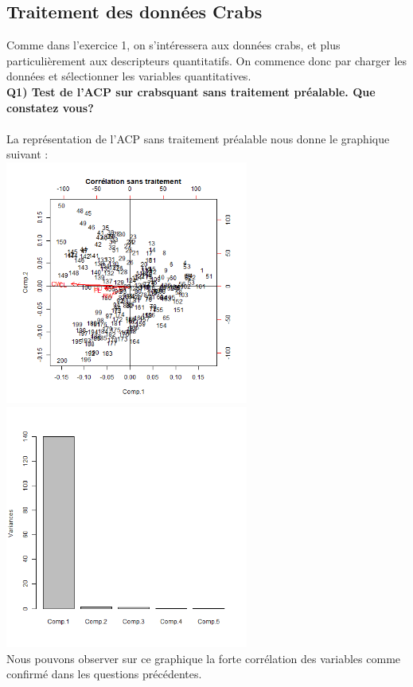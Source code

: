 ﻿\documentclass[a4paper, 9pt]{article}
\begin{document}
\subsection{Traitement des donn\'ees Crabs}
Comme dans l’exercice 1, on s’intéressera aux données crabs, et plus particulièrement aux descripteurs quantitatifs. On commence donc par charger les données et sélectionner les variables
quantitatives.\\


\textbf{Q1) Test de l’ACP sur crabsquant sans traitement préalable. Que constatez vous?}\\ \\
La repr\'esentation de l'ACP sans traitement pr\'ealable nous donne le graphique suivant :\\


\includegraphics[height = 8cm, width = 8cm]{plots/biplot_acp2_crabs.png}
\includegraphics[height = 8cm, width = 8cm]{plots/plot_acp2_crabs.png}\\
Nous pouvons observer sur ce graphique la forte corr\'elation des variables comme confirmé dans les questions pr\'ec\'edentes.\\ \\
\end{document}
